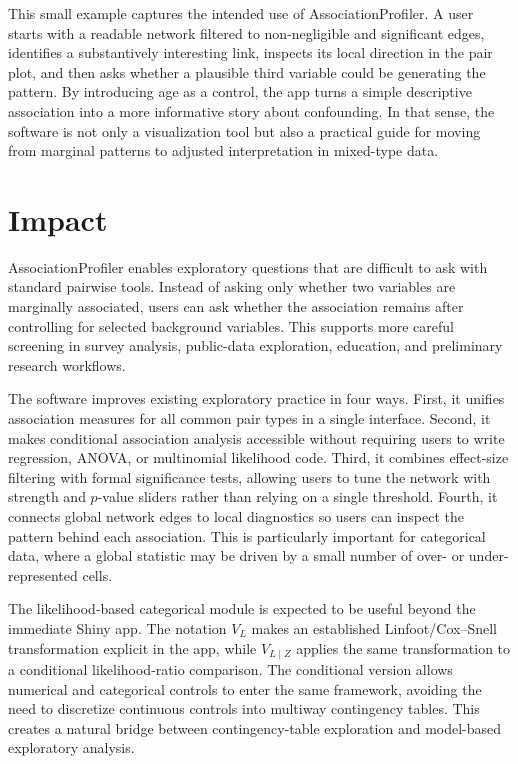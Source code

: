 \documentclass[preprint,12pt,a4paper]{elsarticle}
\numberwithin{equation}{section}
\begin{document}
This small example captures the intended use of AssociationProfiler. A user starts with a readable network filtered to non-negligible and significant edges, identifies a substantively interesting link, inspects its local direction in the pair plot, and then asks whether a plausible third variable could be generating the pattern. By introducing age as a control, the app turns a simple descriptive association into a more informative story about confounding. In that sense, the software is not only a visualization tool but also a practical guide for moving from marginal patterns to adjusted interpretation in mixed-type data.

\section{Impact}

AssociationProfiler enables exploratory questions that are difficult to ask with standard pairwise tools. Instead of asking only whether two variables are marginally associated, users can ask whether the association remains after controlling for selected background variables. This supports more careful screening in survey analysis, public-data exploration, education, and preliminary research workflows.

The software improves existing exploratory practice in four ways. First, it unifies association measures for all common pair types in a single interface. Second, it makes conditional association analysis accessible without requiring users to write regression, ANOVA, or multinomial likelihood code. Third, it combines effect-size filtering with formal significance tests, allowing users to tune the network with strength and $p$-value sliders rather than relying on a single threshold. Fourth, it connects global network edges to local diagnostics so users can inspect the pattern behind each association. This is particularly important for categorical data, where a global statistic may be driven by a small number of over- or under-represented cells.

The likelihood-based categorical module is expected to be useful beyond the immediate Shiny app. The notation $V_L$ makes an established Linfoot/Cox--Snell transformation explicit in the app, while $V_{L\mid Z}$ applies the same transformation to a conditional likelihood-ratio comparison. The conditional version allows numerical and categorical controls to enter the same framework, avoiding the need to discretize continuous controls into multiway contingency tables. This creates a natural bridge between contingency-table exploration and model-based exploratory analysis.
\end{document}
